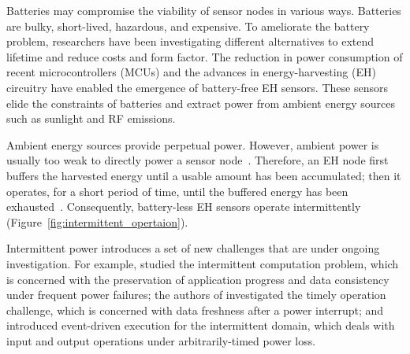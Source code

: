 Batteries may compromise the viability of sensor nodes in various ways. Batteries are bulky, short-lived, hazardous, and expensive. To ameliorate the battery problem, researchers have been investigating different alternatives to extend lifetime and reduce costs and form factor.  
The reduction in power consumption of recent microcontrollers (MCUs) and the advances in energy-harvesting (EH) circuitry have enabled the emergence of battery-free EH sensors. 
These sensors elide the constraints of batteries and extract power from ambient energy sources such as sunlight and RF emissions. 

Ambient energy sources provide perpetual power. However, ambient power is usually too weak to directly power a sensor node~\cite{liu2013ambient}.  Therefore, an EH  node first buffers the harvested energy until a usable amount has been accumulated; then it operates, for a short period of time, until the buffered energy has been exhausted~\cite{lucia2017intermittent}.  Consequently, battery-less EH sensors operate intermittently (Figure~\ref{fig:intermittent_opertaion}).

Intermittent power introduces a set of new challenges that are under ongoing investigation.
For example, \cite{lucia2017intermittent,ransford2011mementos,dino,colin2016chain,balsamo2014hibernus,rodriguez2018restop} studied the intermittent computation problem, which is concerned with the preservation of application progress and data consistency under frequent power failures; the authors of \cite{hester2017timely} investigated the timely operation challenge, which is concerned with data freshness after a power interrupt; 
and \cite{yildirim2018ink} introduced event-driven execution for the intermittent domain, which deals with input and output operations under arbitrarily-timed power loss.


